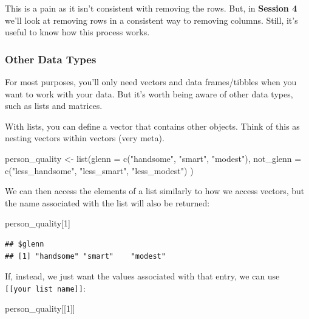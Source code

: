 \documentclass[
]{book}
\newenvironment{Shaded}{\begin{snugshade}}{\end{snugshade}}
\newcommand{\AttributeTok}[1]{\textcolor[rgb]{0.77,0.63,0.00}{#1}}
\newcommand{\DecValTok}[1]{\textcolor[rgb]{0.00,0.00,0.81}{#1}}
\newcommand{\FunctionTok}[1]{\textcolor[rgb]{0.00,0.00,0.00}{#1}}
\newcommand{\NormalTok}[1]{#1}
\newcommand{\OtherTok}[1]{\textcolor[rgb]{0.56,0.35,0.01}{#1}}
\newcommand{\StringTok}[1]{\textcolor[rgb]{0.31,0.60,0.02}{#1}}
\begin{document}
This is a pain as it isn't consistent with removing the rows. But, in \textbf{Session 4} we'll look at removing rows in a consistent way to removing columns. Still, it's useful to know how this process works.

\hypertarget{other-data-types}{%
\subsubsection{Other Data Types}\label{other-data-types}}

For most purposes, you'll only need vectors and data frames/tibbles when you want to work with your data. But it's worth being aware of other data types, such as lists and matrices.

With lists, you can define a vector that contains other objects. Think of this as nesting vectors within vectors (very meta).

\begin{Shaded}
\begin{Highlighting}[]
\NormalTok{person\_quality }\OtherTok{\textless{}{-}} \FunctionTok{list}\NormalTok{(}\AttributeTok{glenn =} \FunctionTok{c}\NormalTok{(}\StringTok{"handsome"}\NormalTok{, }\StringTok{"smart"}\NormalTok{, }\StringTok{"modest"}\NormalTok{),}
                       \AttributeTok{not\_glenn =} \FunctionTok{c}\NormalTok{(}\StringTok{"less\_handsome"}\NormalTok{, }\StringTok{"less\_smart"}\NormalTok{, }\StringTok{"less\_modest"}\NormalTok{)}
\NormalTok{                       )}
\end{Highlighting}
\end{Shaded}

We can then access the elements of a list similarly to how we access vectors, but the name associated with the list will also be returned:

\begin{Shaded}
\begin{Highlighting}[]
\NormalTok{person\_quality[}\DecValTok{1}\NormalTok{]}
\end{Highlighting}
\end{Shaded}

\begin{verbatim}
## $glenn
## [1] "handsome" "smart"    "modest"
\end{verbatim}

If, instead, we just want the values associated with that entry, we can use \texttt{{[}{[}your\ list\ name{]}{]}}:

\begin{Shaded}
\begin{Highlighting}[]
\NormalTok{person\_quality[[}\DecValTok{1}\NormalTok{]]}
\end{Highlighting}
\end{Shaded}
\end{document}
